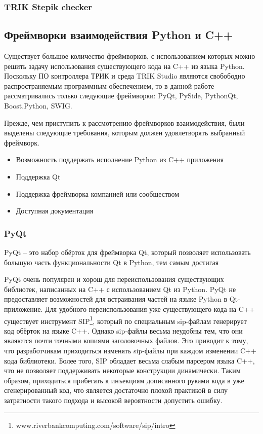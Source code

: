 \documentclass[14pt]{matmex-diploma-custom}
\begin{document}
\subsubsection{TRIK Stepik checker}

\subsection{Фреймворки взаимодействия Python и C++}


Существует большое количество фреймворков, с использованием которых можно решить задачу использования существующего кода на C++ из языка Python. Поскольку ПО контроллера ТРИК и среда TRIK Studio являются свобободно распространяемым программным обеспечением, то в данной работе рассматривались только следующие фреймворки: PyQt, PySide, PythonQt, Boost.Python, SWIG.

Прежде, чем приступить к рассмотрению фреймворков взаимодействия, были выделены следующие требования, которым должен удовлетворять выбранный фреймворк.

\begin{itemize}
    \item Возможность поддержать исполнение Python из C++ приложения
    \item Поддержка Qt
    \item Поддержка фреймворка компанией или сообществом
    \item Доступная документация
\end{itemize}

\subsubsection{PyQt}

PyQt \cite{pyqt} -- это набор обёрток для фреймворка Qt, который позволяет использовать большую часть функциональности Qt в Python, тем самым достигая 

PyQt очень популярен и хорош для переиспользования существующих библиотек, написанных на C++ с использованием Qt из Python. PyQt не предоставляет возможностей для встраивания частей на языке Python в Qt-приложение. Для удобного переиспользования уже существующего кода на C++ существует инструмент SIP\footnote{www.riverbankcomputing.com/software/sip/intro}, который по специальным sip-файлам генерирует код обёрток на языке C++. Однако sip-файлы весьма неудобны тем, что они являются почти точными копиями заголовочных файлов. Это приводит к тому, что разработчикам приходиться изменять sip-файлы при каждом изменении C++ кода библиотеки. Более того, SIP обладает весьма слабым парсером языка C++, что не позволяет поддерживать некоторые конструкции динамически. Таким образом, приходиться прибегать к инъекциям дописанного руками кода в уже сгенерированный код, что является достаточно плохой практикой в силу затратности такого подхода и высокой вероятности допустить ошибку.
\end{document}
